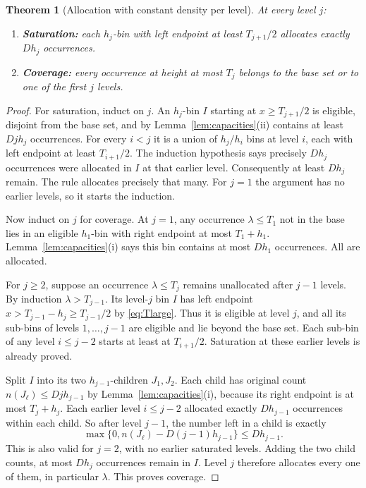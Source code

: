 \documentclass[11pt,letterpaper]{article}
\newtheorem{theorem}{Theorem}[section]
\theoremstyle{remark}\newtheorem{remark}[theorem]{Remark}
\begin{document}
\begin{theorem}[Allocation with constant density per level]\label{thm:allocate}
At every level $j$:
\begin{enumerate}[label=(\alph*)]
\item \textbf{Saturation:} each $h_j$-bin with left endpoint at least $T_{j+1}/2$ allocates exactly $Dh_j$ occurrences.
\item \textbf{Coverage:} every occurrence at height at most $T_j$ belongs to the base set or to one of the first $j$ levels.
\end{enumerate}
\end{theorem}
\begin{proof}
For saturation, induct on $j$. An $h_j$-bin $I$ starting at $x\ge T_{j+1}/2$ is eligible, disjoint from the base set, and by Lemma~\ref{lem:capacities}(ii) contains at least $Dj h_j$ occurrences. For every $i<j$ it is a union of $h_j/h_i$ bins at level $i$, each with left endpoint at least $T_{i+1}/2$. The induction hypothesis says precisely $D h_j$ occurrences were allocated in $I$ at that earlier level. Consequently at least $Dh_j$ remain. The rule allocates precisely that many. For $j=1$ the argument has no earlier levels, so it starts the induction.

Now induct on $j$ for coverage. At $j=1$, any occurrence $\lambda\le T_1$ not in the base lies in an eligible $h_1$-bin with right endpoint at most $T_1+h_1$. Lemma~\ref{lem:capacities}(i) says this bin contains at most $Dh_1$ occurrences. All are allocated.

For $j\ge2$, suppose an occurrence $\lambda\le T_j$ remains unallocated after $j-1$ levels. By induction $\lambda>T_{j-1}$. Its level-$j$ bin $I$ has left endpoint $x> T_{j-1}-h_j\ge T_{j-1}/2$ by \eqref{eq:Tlarge}. Thus it is eligible at level $j$, and all its sub-bins of levels $1,\ldots,j-1$ are eligible and lie beyond the base set. Each sub-bin of any level $i\le j-2$ starts at least at $T_{i+1}/2$. Saturation at these earlier levels is already proved.

Split $I$ into its two $h_{j-1}$-children $J_1,J_2$. Each child has original count $n(J_\ell)\le Dj h_{j-1}$ by Lemma~\ref{lem:capacities}(i), because its right endpoint is at most $T_j+h_j$. Each earlier level $i\le j-2$ allocated exactly $Dh_{j-1}$ occurrences within each child. So after level $j-1$, the number left in a child is exactly
\[
 \max\{0,n(J_\ell)-D(j-1)h_{j-1}\}\le Dh_{j-1}.
\]
This is also valid for $j=2$, with no earlier saturated levels. Adding the two child counts, at most $Dh_j$ occurrences remain in $I$. Level $j$ therefore allocates every one of them, in particular $\lambda$. This proves coverage.
\end{proof}
\end{document}
